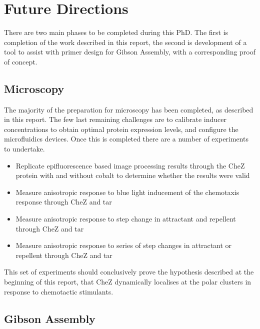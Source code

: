 \documentclass[../main.tex]{subfiles}
\begin{document}
\section{Future Directions}

There are two main phases to be completed during this PhD. The first is completion of the work described in this report, the second is development of a tool to assist with primer design for Gibson Assembly, with a corresponding proof of concept.

\subsection{Microscopy}

The majority of the preparation for microscopy has been completed, as described in this report. The few last remaining challenges are to calibrate inducer concentrations to obtain optimal protein expression levels, and configure the microfluidics devices. Once this is completed there are a number of experiments to undertake.

\begin{itemize}

\item {Replicate epifluorescence based image processing results} through the CheZ protein with and without cobalt to determine whether the results were valid

\item {Measure anisotropic response} to blue light inducement of the chemotaxis response through CheZ and tar

\item {Measure anisotropic response} to step change in attractant and repellent through CheZ and tar

\item {Measure anisotropic response} to series of step changes in attractant or repellent through CheZ and tar

\end{itemize}

This set of experiments should conclusively prove the hypothesis described at the beginning of this report, that CheZ dynamically localises at the polar clusters in response to chemotactic stimulants.
\subsection{Gibson Assembly}
\end{document}
